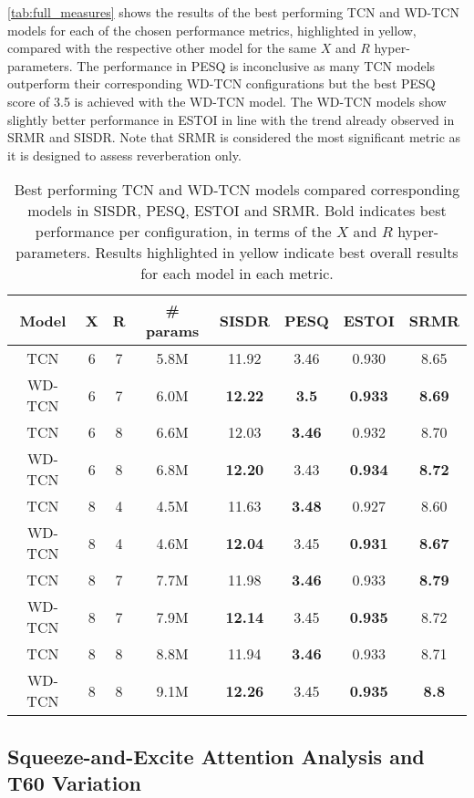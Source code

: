 \documentclass{article}
\begin{document}
\autoref{tab:full_measures} shows the results of the best performing TCN and WD-TCN models for each of the chosen performance metrics, highlighted in yellow, compared with the respective other model for the same $X$ and $R$ hyper-parameters. 
The performance in PESQ is inconclusive as many \ac{TCN} models outperform their corresponding \ac{WD-TCN} configurations but the best PESQ score of 3.5 is achieved with the \ac{WD-TCN} model. The \ac{WD-TCN} models show slightly better performance in ESTOI in line with the trend already observed in SRMR and SISDR. Note that SRMR is considered the most significant metric as it is designed to assess reverberation only.
\begin{table}[!ht]
\begin{tabular}{|c|c|c|c|cccc|}
\hline
\rowcolor[HTML]{C0C0C0} 
\textbf{Model} & \textbf{X} & \textbf{R} & \textbf{\# params} & \textbf{SISDR} & \textbf{PESQ} & \textbf{ESTOI} & \textbf{SRMR} \\ \hline
TCN & 6 & 7 & 5.8M & 11.92 & 3.46 & 0.930 & 8.65 \\
WD-TCN & 6 & 7 & 6.0M & \textbf{12.22} & \cellcolor[HTML]{FFFFC7}\textbf{3.5} & \textbf{0.933} & \textbf{8.69} \\ \hline
TCN & 6 & 8 & 6.6M & \cellcolor[HTML]{FFFFC7}12.03 & \textbf{3.46} & 0.932 & 8.70 \\
WD-TCN & 6 & 8 & 6.8M & \textbf{12.20} & 3.43 & \textbf{0.934} & \textbf{8.72} \\ \hline
TCN & 8 & 4 & 4.5M & 11.63 & \cellcolor[HTML]{FFFFC7}\textbf{3.48} & 0.927 & 8.60 \\
WD-TCN & 8 & 4 & 4.6M & \textbf{12.04} & 3.45 & \textbf{0.931} & \textbf{8.67} \\ \hline
TCN & 8 & 7 & 7.7M & 11.98 & \textbf{3.46} & 0.933 & \cellcolor[HTML]{FFFFC7}\textbf{8.79} \\
WD-TCN & 8 & 7 & 7.9M & \textbf{12.14} & 3.45 & \textbf{0.935} & 8.72 \\ \hline
TCN & 8 & 8 & 8.8M & 11.94 & \textbf{3.46} & \cellcolor[HTML]{FFFFC7}0.933 & 8.71 \\
WD-TCN & 8 & 8 & 9.1M & \cellcolor[HTML]{FFFFC7}\textbf{12.26} & 3.45 & \cellcolor[HTML]{FFFFC7}\textbf{0.935} & \cellcolor[HTML]{FFFFC7}\textbf{8.8} \\ \hline
\end{tabular}
\caption{Best performing TCN and WD-TCN models compared corresponding models in SISDR, PESQ, ESTOI and SRMR. Bold indicates best performance per configuration, in terms of the $X$ and $R$ hyper-parameters. Results highlighted in yellow indicate best overall results for each model in each metric.}
\label{tab:full_measures}
\end{table} \subsection{Squeeze-and-Excite Attention Analysis and T60 Variation}
\end{document}
